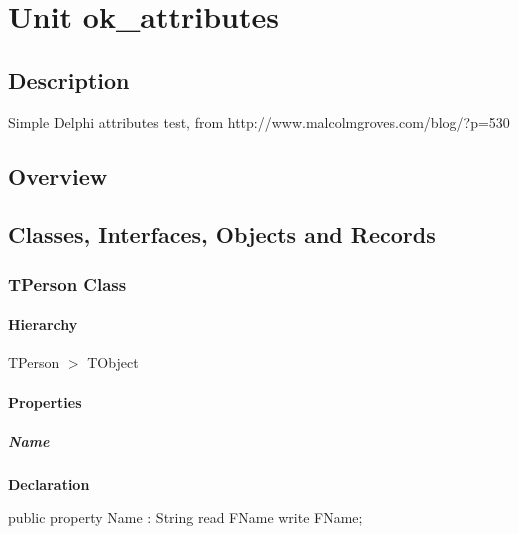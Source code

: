 \documentclass{report}
\begin{document}
\newlength{\tmplength}
\chapter{Unit ok{\_}attributes}
\section{Description}
Simple Delphi attributes test, from http://www.malcolmgroves.com/blog/?p=530
\section{Overview}
\begin{description}
\item[\texttt{\begin{ttfamily}TPerson\end{ttfamily} Class}]
\item[\texttt{\begin{ttfamily}IUIContainer\end{ttfamily} Interface}]
\end{description}
\section{Classes, Interfaces, Objects and Records}
\subsection*{TPerson Class}
\subsubsection*{\large{\textbf{Hierarchy}}\normalsize\hspace{1ex}\hfill}
TPerson {$>$} TObject
\subsubsection*{\large{\textbf{Properties}}\normalsize\hspace{1ex}\hfill}
\paragraph*{Name}\hspace*{\fill}

\begin{list}{}{
\setlength{\itemindent}{0cm}
\setlength{\listparindent}{0cm}
\setlength{\leftmargin}{\evensidemargin}
\addtolength{\leftmargin}{\tmplength}
\settowidth{\labelsep}{X}
\addtolength{\leftmargin}{\labelsep}
\setlength{\labelwidth}{\tmplength}
}
\begin{flushleft}
\item[\textbf{Declaration}\hfill]
\begin{ttfamily}
public property Name : String read FName write FName;\end{ttfamily}


\end{flushleft}
\end{list}
\end{document}
